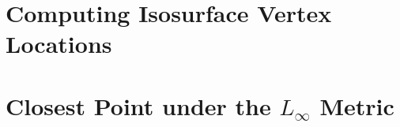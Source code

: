 
\appendix

\section{Computing Isosurface Vertex Locations}
\label{appendix:loc}

\section{Closest Point under the $L_\infty$ Metric}
\label{appendix:Linf}

